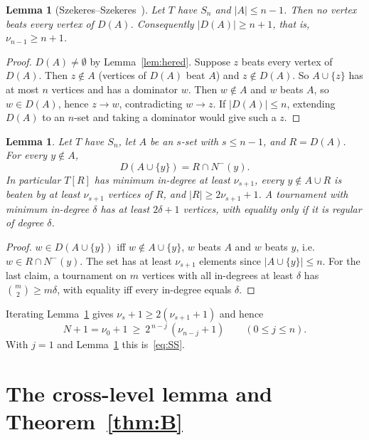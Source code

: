\documentclass[11pt]{amsart}
\newtheorem{lemma}[theorem]{Lemma}
\theoremstyle{definition}
\theoremstyle{remark}
\newcommand{\D}{D}
\newcommand{\Nin}{N^{-}}
\newcommand{\abs}[1]{\lvert #1\rvert}
\begin{document}
\begin{lemma}[Szekeres--Szekeres~\cite{SS65}]\label{lem:szekeres}
Let $T$ have $S_n$ and $\abs{A}\le n-1$. Then no vertex beats every vertex of $\D(A)$. Consequently $\abs{\D(A)}\ge n+1$, that is,
$\nu_{n-1}\ge n+1$.
\end{lemma}

\begin{proof}
$\D(A)\neq\emptyset$ by Lemma~\ref{lem:hered}. Suppose $z$ beats every vertex of $\D(A)$. Then $z\notin A$ (vertices of $\D(A)$ beat
$A$) and $z\notin\D(A)$. So $A\cup\{z\}$ has at most $n$ vertices and has a dominator $w$. Then $w\notin A$ and $w$ beats $A$, so
$w\in\D(A)$, hence $z\to w$, contradicting $w\to z$. If $\abs{\D(A)}\le n$, extending $\D(A)$ to an $n$-set and taking a dominator
would give such a $z$.
\end{proof}

\begin{lemma}\label{lem:level}
Let $T$ have $S_n$, let $A$ be an $s$-set with $s\le n-1$, and $R=\D(A)$. For every $y\notin A$,
\begin{equation}\label{eq:level}
  \D(A\cup\{y\})=R\cap \Nin(y).
\end{equation}
In particular $T[R]$ has minimum in-degree at least $\nu_{s+1}$, every $y\notin A\cup R$ is beaten by at least $\nu_{s+1}$ vertices of
$R$, and $\abs{R}\ge 2\nu_{s+1}+1$. A tournament with minimum in-degree $\delta$ has at least $2\delta+1$ vertices, with equality
only if it is regular of degree $\delta$.
\end{lemma}

\begin{proof}
$w\in\D(A\cup\{y\})$ iff $w\notin A\cup\{y\}$, $w$ beats $A$ and $w$ beats $y$, i.e.\ $w\in R\cap\Nin(y)$. The set has at least
$\nu_{s+1}$ elements since $\abs{A\cup\{y\}}\le n$. For the last claim, a tournament on $m$ vertices with all in-degrees at least
$\delta$ has $\binom m2\ge m\delta$, with equality iff every in-degree equals $\delta$.
\end{proof}

Iterating Lemma~\ref{lem:level} gives $\nu_s+1\ge 2(\nu_{s+1}+1)$ and hence
\begin{equation}\label{eq:doubling}
  N+1=\nu_0+1\ \ge\ 2^{\,n-j}\,(\nu_{n-j}+1)\qquad (0\le j\le n).
\end{equation}
With $j=1$ and Lemma~\ref{lem:szekeres} this is~\eqref{eq:SS}.

\section{\texorpdfstring{The cross-level lemma and Theorem~\ref{thm:B}}{The cross-level lemma and Theorem 1.2}}\label{sec:B}
\end{document}
